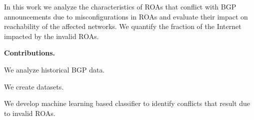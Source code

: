 {In this work we analyze the characteristics of ROAs that conflict with BGP announcements due to misconfigurations in ROAs and evaluate their impact on reachability of the affected networks. We quantify the fraction of the Internet impacted by the invalid ROAs. %




{\bf Contributions.}

We analyze historical BGP data.

We create datasets.

We develop machine learning based classifier to identify conflicts that result due to invalid ROAs.
}




